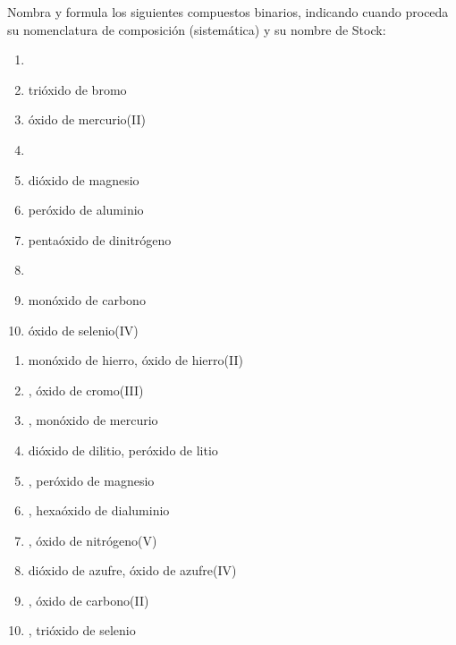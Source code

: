 \documentclass[10pt,a5paper,twoside]{article}
\begin{document}
\begin{exercise}[
    tags    = {inorgánica,compuestos binarios,óxidos,peróxidos},
    topics  = {química inorgánica,formulación,nomenclatura},
    source  = {SAN Formulación, p27, e31},
  ]
  Nombra y formula los siguientes compuestos binarios, indicando cuando proceda su nomenclatura de composición (sistemática) y su nombre de Stock:

  \begin{enumerate}
    \item {}
    \item trióxido de bromo
    \item óxido de mercurio(II)
    \item {}
    \item dióxido de magnesio
    \item peróxido de aluminio
    \item pentaóxido de dinitrógeno
    \item {}
    \item monóxido de carbono
    \item óxido de selenio(IV)
  \end{enumerate}
\end{exercise}

\begin{solution}
  \begin{enumerate}
    \item monóxido de hierro, óxido de hierro(II)
    \item {}, óxido de cromo(III)
    \item {}, monóxido de mercurio
    \item dióxido de dilitio, peróxido de litio
    \item {}, peróxido de magnesio
    \item {}, hexaóxido de dialuminio
    \item {}, óxido de nitrógeno(V)
    \item dióxido de azufre, óxido de azufre(IV)
    \item {}, óxido de carbono(II)
    \item {}, trióxido de selenio
  \end{enumerate}
\end{solution}
\end{document}
